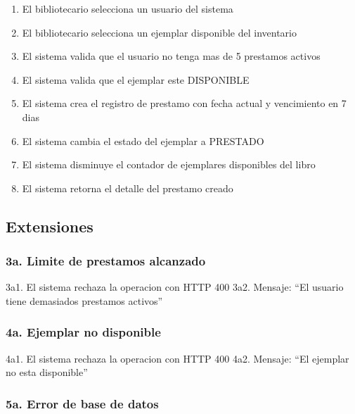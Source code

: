\documentclass[
11pt,
a4paper,
]{report}
\providecommand{\tightlist}{%
	\setlength{\itemsep}{0pt}\setlength{\parskip}{0pt}}
\begin{document}
	\begin{enumerate}
		\def\labelenumi{\arabic{enumi}.}
		\tightlist
		\item
		El bibliotecario selecciona un usuario del sistema
		\item
		El bibliotecario selecciona un ejemplar disponible del inventario
		\item
		El sistema valida que el usuario no tenga mas de 5 prestamos activos
		\item
		El sistema valida que el ejemplar este DISPONIBLE
		\item
		El sistema crea el registro de prestamo con fecha actual y vencimiento en 7 dias
		\item
		El sistema cambia el estado del ejemplar a PRESTADO
		\item
		El sistema disminuye el contador de ejemplares disponibles del libro
		\item
		El sistema retorna el detalle del prestamo creado
	\end{enumerate}
	
	\hypertarget{extensiones-2}{%
		\subsection{Extensiones}\label{extensiones-2}}
	
	\hypertarget{a.-limite-de-prestamos-alcanzado}{%
		\subsubsection{3a. Limite de prestamos alcanzado}\label{a.-limite-de-prestamos-alcanzado}}
	
	3a1. El sistema rechaza la operacion con HTTP 400
	3a2. Mensaje: ``El usuario tiene demasiados prestamos activos''
	
	\hypertarget{a.-ejemplar-no-disponible}{%
		\subsubsection{4a. Ejemplar no disponible}\label{a.-ejemplar-no-disponible}}
	
	4a1. El sistema rechaza la operacion con HTTP 400
	4a2. Mensaje: ``El ejemplar no esta disponible''
	
	\hypertarget{a.-error-de-base-de-datos}{%
		\subsubsection{5a. Error de base de datos}\label{a.-error-de-base-de-datos}}
	
\end{document}
